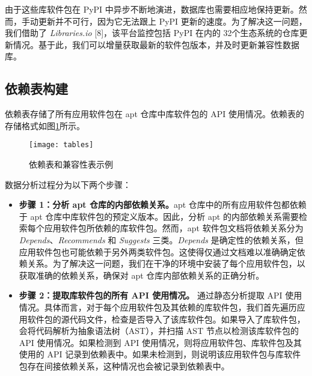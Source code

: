 由于这些库软件包在 PyPI 中异步不断地演进，数据库也需要相应地保持更新。然而，手动更新并不可行，因为它无法跟上 PyPI 更新的速度。为了解决这一问题，我们借助了 \textit{Libraries.io} [8]，该平台监控包括 PyPI 在内的 32个生态系统的仓库更新情况。基于此，我们可以增量获取最新的软件包版本，并及时更新兼容性数据库。

\subsection{依赖表构建}\label{4.1.2}
依赖表存储了所有应用软件包在 apt 仓库中库软件包的 API 使用情况。依赖表的存储格式如图\ref{fig:storage}所示。
\begin{figure}[htbp] %
	\centering
	\texttt{[image: tables]}
	\caption{依赖表和兼容性表示例}
	\label{fig:storage}
\end{figure}
数据分析过程分为以下两个步骤：
\begin{itemize}
	\item \textbf{步骤 1：分析 apt 仓库的内部依赖关系。}apt 仓库中的所有应用软件包都依赖于 apt 仓库中库软件包的预定义版本。因此，分析 apt 的内部依赖关系需要检索每个应用软件包所依赖的库软件包。然而，apt 软件包文档将依赖关系分为 \textit{Depends}、\textit{Recommends} 和 \textit{Suggests} 三类。\textit{Depends} 是确定性的依赖关系，但应用软件包也可能依赖于另外两类软件包。这使得仅通过文档难以准确确定依赖关系。为了解决这一问题，我们在干净的环境中安装了每个应用软件包，以获取准确的依赖关系，确保对 apt 仓库内部依赖关系的正确分析。
	\item \textbf{步骤 2：提取库软件包的所有 API 使用情况。}\tool{} 通过静态分析提取 API 使用情况。具体而言，对于每个应用软件包及其依赖的库软件包，我们首先遍历应用软件包的源代码文件，检查是否导入了该库软件包。如果导入了库软件包，\tool{} 会将代码解析为抽象语法树（AST），并扫描 AST 节点以检测该库软件包的 API 使用情况。如果检测到 API 使用情况，则将应用软件包、库软件包及其使用的 API 记录到依赖表中。如果未检测到，则说明该应用软件包与库软件包存在间接依赖关系，这种情况也会被记录到依赖表中。
\end{itemize}
